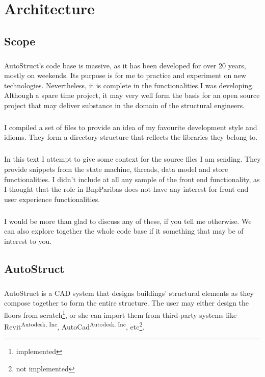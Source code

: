 \chapter{Architecture}
\section{Scope}
\paragraph{}
AutoStruct's code base is massive, as it has been developed for over 20 years, mostly on weekends. Its purpose is for me to practice and experiment on new technologies. Nevertheless, it is complete in the functionalities I was developing. Although a spare time project, it may very well form the basis for an open source project that may deliver substance in the domain of the structural engineers.
\paragraph{}
I compiled a set of files to provide an idea of my favourite development style and idioms. They form a directory structure that reflects the libraries they belong to.
\paragraph{}
In this text I attempt to give some context for the source files I am sending. They provide snippets from the state machine, threads, data model and store functionalities. I didn't include at all any sample of the front end functionality, as I thought that the role in BnpParibas does not have any interest for front end user experience functionalities.
\paragraph{}
I would be more than glad to discuss any of these, if you tell me otherwise. We can also explore together the whole code base if it something that may be of interest to you.
\section{AutoStruct}
\paragraph{}
AutoStruct is a CAD system that designs buildings' structural elements as they compose together to form the entire structure. The user may either design the floors from scratch\footnote{implemented}, or she can import them from third-party systems like Revit\textsuperscript{Autodesk, Inc}, AutoCad\textsuperscript{Autodesk, Inc}, etc\footnote{not implemented}. 

